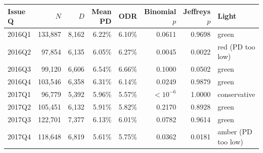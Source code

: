 \begin{tabular}{lrrrrrrl}
\toprule
Issue Q & $N$ & $D$ & Mean PD & ODR & Binomial $p$ & Jeffreys $p$ & Light \\
\midrule
2016Q1 & 133,887 & 8,162 & 6.22\% & 6.10\% & 0.0611 & 0.9698 & green \\
2016Q2 & 97,854 & 6,135 & 6.05\% & 6.27\% & 0.0045 & 0.0022 & red (PD too low) \\
2016Q3 & 99,120 & 6,606 & 6.54\% & 6.66\% & 0.1000 & 0.0502 & green \\
2016Q4 & 103,546 & 6,358 & 6.31\% & 6.14\% & 0.0249 & 0.9879 & green \\
2017Q1 & 96,779 & 5,392 & 5.96\% & 5.57\% & $<10^{-6}$ & 1.0000 & conservative \\
2017Q2 & 105,451 & 6,132 & 5.91\% & 5.82\% & 0.2170 & 0.8928 & green \\
2017Q3 & 122,701 & 7,377 & 6.13\% & 6.01\% & 0.0782 & 0.9614 & green \\
2017Q4 & 118,648 & 6,819 & 5.61\% & 5.75\% & 0.0362 & 0.0181 & amber (PD too low) \\
\bottomrule
\end{tabular}
